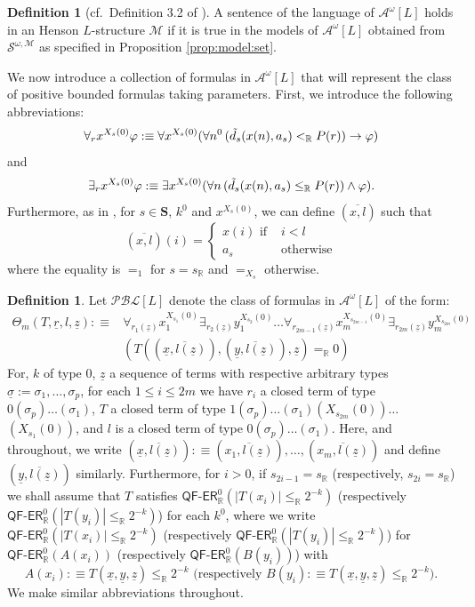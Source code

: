 \documentclass[11pt]{amsart}
\theoremstyle{definition}
\newtheorem{definition}[theorem]{Definition}
\theoremstyle{remark}
\def\RR{\mathbb{R}}
\newcommand{\QFER}{\textsf{QF}\mbox{-}\textsf{ER}}
\begin{document}
\begin{definition}[cf.\ Definition 3.2 of \cite{kohlenbach2005some}]
     A sentence of the language of $\mathcal{A}^\omega[L]$ holds in an Henson $L$-structure $\mathscr{M}$ if it is true in the models of $\mathcal{A}^\omega[L]$ obtained from $\mathcal{S}^{\omega,\mathscr{M}}$ as specified in Proposition \ref{prop:model:set}.
\end{definition}
We now introduce a collection of formulas in $\mathcal{A}^\omega[L]$ that will represent the class of positive bounded formulas taking parameters. First, we introduce the following abbreviations:
\[ 
\forall_rx^{X_s(0)}\varphi:\equiv\forall x^{X_s(0)}(\forall n^0\,(\Tilde{d_s}(x(n),a_s)<_\RR P(r))\to \varphi)
\]
and 
\[
\exists_rx^{X_s(0)}\varphi:\equiv \exists x^{X_s(0)}(\forall n\, (\Tilde{d_s}(x(n),a_s)\le_\RR P(r))\land \varphi).
\]
Furthermore, as in \cite[p. 201]{Kohlenbach2008}, for $s \in \mathbf{S}$, $k^0$ and $x^{X_s(0)}$, we can define $(\overline{x,l})$ such that   
\[
(\overline{x,l})(i)= \begin{cases} x(i) \text{ if } &i<l \\
a_s&\text{otherwise}\end{cases}
\]
where the equality is $=_1$ for $s = s_\RR$ and $=_{X_s}$ otherwise.
\begin{definition}
Let $\mathcal{PBL}[L]$ denote the class of formulas in $\mathcal{A}^\omega[L]$ of the form:
\begin{align*}
    \Theta_m(T,\underline{r},l,\underline{z}):\equiv &\forall_{r_1(\underline{z})} x_1^{X_{s_1}(0)} \exists_{r_2(\underline{z})} y_1^{X_{s_2}(0)} \ldots \forall_{r_{2m-1}(\underline{z})} x_m^{X_{s_{2m-1}}(0)}\exists_{r_{2m}(\underline{z})} y_m^{X_{s_{2m}}(0)}\\&(T((\overline{\underline{x},l(\underline{z})}),(\overline{\underline{y},l(\underline{z})}),\underline{z})=_\RR 0)
\end{align*}
For, $k$ of type $0$, $\underline{z}$ a sequence of terms with respective arbitrary types $\underline{\sigma}:= \sigma_1,\ldots,\sigma_p$, for each $1\le i \le 2m$ we have $r_i$ a closed term of type $0(\sigma_p)\ldots(\sigma_1)$, $T$ a closed term of type $1(\sigma_p)\ldots(\sigma_1)(X_{s_{2m}}(0))\ldots$ $(X_{s_{1}}(0))$, and $l$ is a closed term of type $0(\sigma_p)\ldots(\sigma_1)$. Here, and throughout, we write $(\overline{\underline{x},l(\underline{z})}):\equiv (\overline{x_1,l(\underline{z})}), \ldots, (\overline{x_m,l(\underline{z})})$ and define $(\overline{\underline{y},l(\underline{z})})$ similarly. Furthermore, for $i >0$, if $s_{2i-1}=s_\RR$ (respectively, $s_{2i}=s_\RR$) we shall assume that $T$ satisfies $\QFER^0_\RR(|T(x_i)|\le_\RR 2^{-k})$ (respectively $\QFER^0_\RR(|T(y_i)|\le_\RR  2^{-k})$) for each $k^0$, where we write $\QFER^0_\RR(|T(x_i)|\le_\RR 2^{-k})$ (respectively $\QFER^0_\RR(|T(y_i)|\le_\RR  2^{-k})$)  for $\QFER^0_\RR(A(x_i))$ (respectively $\QFER^0_\RR(B(y_i))$) with 
\[
A(x_i) :\equiv T(\underline{x},\underline{y}, \underline{z}) \le_\RR 2^{-k} \mbox{ (respectively } B(y_i) :\equiv T(\underline{x},\underline{y}, \underline{z})  \le_\RR 2^{-k} \mbox{)}.
\]
We make similar abbreviations throughout.
\end{definition}
\end{document}
